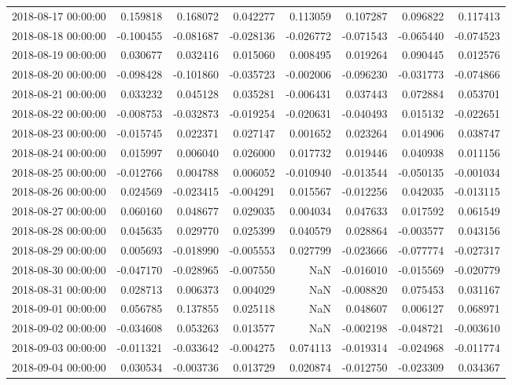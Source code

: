 \begin{tabular}{lrrrrrrr}
2018-08-17 00:00:00 & 0.159818 & 0.168072 & 0.042277 & 0.113059 & 0.107287 & 0.096822 & 0.117413 \\
2018-08-18 00:00:00 & -0.100455 & -0.081687 & -0.028136 & -0.026772 & -0.071543 & -0.065440 & -0.074523 \\
2018-08-19 00:00:00 & 0.030677 & 0.032416 & 0.015060 & 0.008495 & 0.019264 & 0.090445 & 0.012576 \\
2018-08-20 00:00:00 & -0.098428 & -0.101860 & -0.035723 & -0.002006 & -0.096230 & -0.031773 & -0.074866 \\
2018-08-21 00:00:00 & 0.033232 & 0.045128 & 0.035281 & -0.006431 & 0.037443 & 0.072884 & 0.053701 \\
2018-08-22 00:00:00 & -0.008753 & -0.032873 & -0.019254 & -0.020631 & -0.040493 & 0.015132 & -0.022651 \\
2018-08-23 00:00:00 & -0.015745 & 0.022371 & 0.027147 & 0.001652 & 0.023264 & 0.014906 & 0.038747 \\
2018-08-24 00:00:00 & 0.015997 & 0.006040 & 0.026000 & 0.017732 & 0.019446 & 0.040938 & 0.011156 \\
2018-08-25 00:00:00 & -0.012766 & 0.004788 & 0.006052 & -0.010940 & -0.013544 & -0.050135 & -0.001034 \\
2018-08-26 00:00:00 & 0.024569 & -0.023415 & -0.004291 & 0.015567 & -0.012256 & 0.042035 & -0.013115 \\
2018-08-27 00:00:00 & 0.060160 & 0.048677 & 0.029035 & 0.004034 & 0.047633 & 0.017592 & 0.061549 \\
2018-08-28 00:00:00 & 0.045635 & 0.029770 & 0.025399 & 0.040579 & 0.028864 & -0.003577 & 0.043156 \\
2018-08-29 00:00:00 & 0.005693 & -0.018990 & -0.005553 & 0.027799 & -0.023666 & -0.077774 & -0.027317 \\
2018-08-30 00:00:00 & -0.047170 & -0.028965 & -0.007550 & NaN & -0.016010 & -0.015569 & -0.020779 \\
2018-08-31 00:00:00 & 0.028713 & 0.006373 & 0.004029 & NaN & -0.008820 & 0.075453 & 0.031167 \\
2018-09-01 00:00:00 & 0.056785 & 0.137855 & 0.025118 & NaN & 0.048607 & 0.006127 & 0.068971 \\
2018-09-02 00:00:00 & -0.034608 & 0.053263 & 0.013577 & NaN & -0.002198 & -0.048721 & -0.003610 \\
2018-09-03 00:00:00 & -0.011321 & -0.033642 & -0.004275 & 0.074113 & -0.019314 & -0.024968 & -0.011774 \\
2018-09-04 00:00:00 & 0.030534 & -0.003736 & 0.013729 & 0.020874 & -0.012750 & -0.023309 & 0.034367 \\

\end{tabular}
